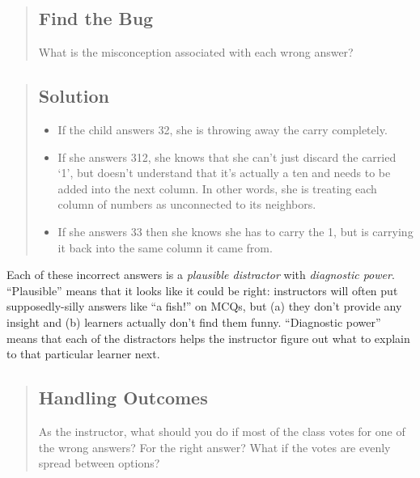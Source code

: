 \begin{quotation}   %
\subsection*{Find the Bug}

What is the misconception associated with each wrong answer?
\end{quotation}   %

\begin{quotation}   %
\subsection*{Solution}

\begin{itemize}
\item If the child answers 32, she is throwing away the carry completely.
\item If she answers 312, she knows that she can't just discard the carried `1',
but doesn't understand that it's actually a ten
and needs to be added into the next column.
In other words,
she is treating each column of numbers as unconnected to its neighbors.
\item If she answers 33 then she knows she has to carry the 1,
but is carrying it back into the same column it came from.
\end{itemize}
\end{quotation}   %

Each of these incorrect answers is a \emph{plausible distractor} with \emph{diagnostic power}.
``Plausible'' means that it looks like it could be right:
instructors will often put supposedly-silly answers like ``a fish!'' on MCQs,
but (a) they don't provide any insight
and (b) learners actually don't find them funny.
``Diagnostic power'' means that each of the distractors helps the instructor figure out
what to explain to that particular learner next.

\begin{quotation}   %
\subsection*{Handling Outcomes}

As the instructor, what should you do if most of the class votes for one
of the wrong answers?  For the right answer?  What if the votes are evenly
spread between options?
\end{quotation}   %

